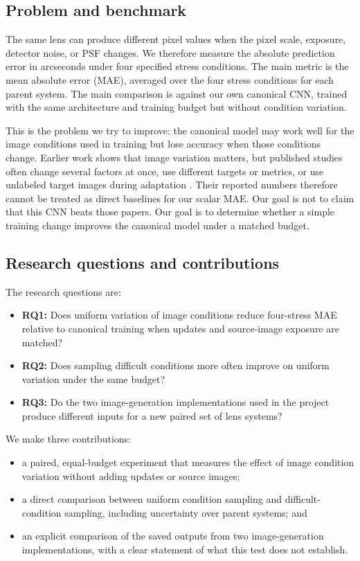 \documentclass[letterpaper]{article}
\begin{document}
\subsection{Problem and benchmark}

The same lens can produce different pixel values when the pixel scale,
exposure, detector noise, or PSF changes. We therefore measure the absolute
prediction error in arcseconds under four specified stress conditions. The
main metric is the mean absolute error (MAE), averaged over the four stress
conditions for each parent system. The main comparison is against our own
canonical CNN, trained with the same architecture and training budget but
without condition variation.

This is the problem we try to improve: the canonical model may work well for
the image conditions used in training but lose accuracy when those conditions
change. Earlier work shows that image variation matters, but published studies
often change several factors at once, use different targets or metrics, or use
unlabeled target images during adaptation \citep{pearson2019effect,swierc2023domain,agarwal2024domain}.
Their reported numbers therefore cannot be treated as direct baselines for our
scalar MAE. Our goal is not to claim that this CNN beats those papers. Our goal
is to determine whether a simple training change improves the canonical model
under a matched budget.

\subsection{Research questions and contributions}

The research questions are:

\begin{itemize}
\item \textbf{RQ1:} Does uniform variation of image conditions reduce
four-stress MAE relative to canonical training when updates and source-image
exposure are matched?
\item \textbf{RQ2:} Does sampling difficult conditions more often improve on
uniform variation under the same budget?
\item \textbf{RQ3:} Do the two image-generation implementations used in the
project produce different inputs for a new paired set of lens systems?
\end{itemize}

We make three contributions:

\begin{itemize}
\item a paired, equal-budget experiment that measures the effect of image
condition variation without adding updates or source images;
\item a direct comparison between uniform condition sampling and
difficult-condition sampling, including uncertainty over parent systems; and
\item an explicit comparison of the saved outputs from two image-generation
implementations, with a clear statement of what this test does not establish.
\end{itemize}
\end{document}

